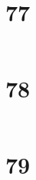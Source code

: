 \documentclass[12pt,a4paper]{article}
\begin{document}
\section{77}
\begin{CJK}{UTF8}{gbsn}
\end{CJK}
\begin{lstlisting}
\end{lstlisting}

\section{78}
\begin{CJK}{UTF8}{gbsn}
\end{CJK}
\begin{lstlisting}
\end{lstlisting}

\section{79}
\begin{CJK}{UTF8}{gbsn}
\end{CJK}
\begin{lstlisting}
\end{lstlisting}
\end{document}
